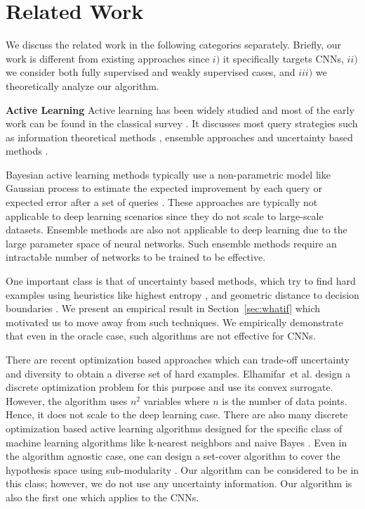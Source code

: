 \documentclass{article}
\begin{document}
\section{Related Work}
We discuss the related work in the following categories separately. Briefly, our work is different from existing approaches since $i)$ it specifically targets CNNs, $ii)$ we consider both fully supervised and weakly supervised cases, and $iii)$ we theoretically analyze our algorithm.

\noindent\textbf{Active Learning}
Active learning has been widely studied and most of the early work can be found in the classical survey \cite{settles2010active}. It discusses most query strategies such as information theoretical methods \cite{mackay1992information}, ensemble approaches \cite{mccallumzy1998employing, freund1997selective} and uncertainty based methods \cite{tong2001support,lewissequential,joshi2009multi,li2013adaptive}. %

Bayesian active learning methods typically use a non-parametric model like Gaussian process to estimate the expected improvement by each query \cite{kapoor2007active} or expected error after a set of queries \cite{roy2001toward}. These approaches are typically not applicable to deep learning scenarios since they do not scale to large-scale datasets. Ensemble methods are also not applicable to deep learning due to the large parameter space of neural networks. Such ensemble methods require an intractable number of networks to be trained to be effective.

One important class is that of uncertainty based methods, which try to find hard examples using heuristics like highest entropy \cite{joshi2009multi}, and geometric distance to decision boundaries \cite{tong2001support,brinker2003incorporating}. We present an empirical result in Section~\ref{sec:whatif} which motivated us to move away from such techniques. We empirically demonstrate that even in the oracle case, such algorithms are not effective for CNNs.

There are recent optimization based approaches which can trade-off uncertainty and diversity to obtain a diverse set of hard examples. Elhamifar~et al.  \cite{elhamifar2013convex} design a discrete optimization problem for this purpose and use its convex surrogate. However, the algorithm uses $n^2$ variables where $n$ is the number of data points. Hence, it does not scale to the deep learning case. There are also many discrete optimization based active learning algorithms designed for the specific class of machine learning algorithms like k-nearest neighbors and naive Bayes \cite{wei2015submodularity}. Even in the algorithm agnostic case, one can design a set-cover algorithm to cover the hypothesis space using sub-modularity \cite{guillory2010interactive, golovin2011adaptive}. Our algorithm can be considered to be in this class; however, we do not use any uncertainty information. Our algorithm is also the first one which applies to the CNNs.
\end{document}

